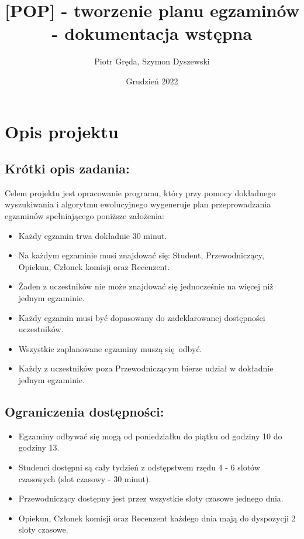 \documentclass{article}
\title{[POP] - tworzenie planu egzaminów - dokumentacja wstępna}
\author{Piotr Gręda, Szymon Dyszewski}
\date{Grudzień 2022}
\begin{document}
\maketitle

\section{Opis projektu}

\subsection{Krótki opis zadania:} Celem projektu jest opracowanie programu, który przy pomocy dokładnego wyszukiwania i algorytmu ewolucyjnego wygeneruje plan przeprowadzania egzaminów spełniającego poniższe założenia:
\begin{itemize}
    \item Każdy egzamin trwa dokładnie 30 minut.
    \item Na każdym egzaminie musi znajdować się: Student, Przewodniczący, Opiekun, Członek komisji oraz Recenzent.
    \item Żaden z uczestników nie może znajdować się jednocześnie na więcej niż jednym egzaminie.
    \item Każdy egzamin musi być dopasowany do zadeklarowanej dostępności uczestników.
    \item Wszystkie zaplanowane egzaminy muszą się odbyć.
    \item Każdy z uczestników poza Przewodniczącym bierze udział w dokładnie jednym egzaminie.
\end{itemize}

\subsection{Ograniczenia dostępności:}
\begin{itemize}
    \item Egzaminy odbywać się mogą od poniedziałku do piątku od godziny 10 do godziny 13.
    \item Studenci dostępni są cały tydzień z odstępstwem rzędu 4 - 6 slotów czasowych (slot czasowy - 30 minut).
    \item Przewodniczący dostępny jest przez wszystkie sloty czasowe jednego dnia.
    \item Opiekun, Członek komisji oraz Recenzent każdego dnia mają do dyspozycji 2 sloty czasowe.
\end{itemize}
\end{document}
